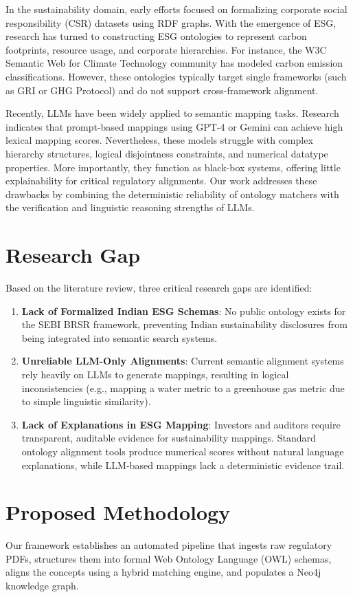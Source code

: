 \documentclass[journal,compsoc]{IEEEtran}
\begin{document}
\begin{itemize}
\begin{table}[t]
\begin{itemize}
In the sustainability domain, early efforts focused on formalizing corporate social responsibility (CSR) datasets using RDF graphs. With the emergence of ESG, research has turned to constructing ESG ontologies to represent carbon footprints, resource usage, and corporate hierarchies. For instance, the W3C Semantic Web for Climate Technology community has modeled carbon emission classifications. However, these ontologies typically target single frameworks (such as GRI or GHG Protocol) and do not support cross-framework alignment.

Recently, LLMs have been widely applied to semantic mapping tasks. Research indicates that prompt-based mappings using GPT-4 or Gemini can achieve high lexical mapping scores. Nevertheless, these models struggle with complex hierarchy structures, logical disjointness constraints, and numerical datatype properties. More importantly, they function as black-box systems, offering little explainability for critical regulatory alignments. Our work addresses these drawbacks by combining the deterministic reliability of ontology matchers with the verification and linguistic reasoning strengths of LLMs.

\section{Research Gap}
Based on the literature review, three critical research gaps are identified:
\begin{enumerate}
    \item \textbf{Lack of Formalized Indian ESG Schemas}: No public ontology exists for the SEBI BRSR framework, preventing Indian sustainability disclosures from being integrated into semantic search systems.
    \item \textbf{Unreliable LLM-Only Alignments}: Current semantic alignment systems rely heavily on LLMs to generate mappings, resulting in logical inconsistencies (e.g., mapping a water metric to a greenhouse gas metric due to simple linguistic similarity).
    \item \textbf{Lack of Explanations in ESG Mapping}: Investors and auditors require transparent, auditable evidence for sustainability mappings. Standard ontology alignment tools produce numerical scores without natural language explanations, while LLM-based mappings lack a deterministic evidence trail.
\end{enumerate}

\section{Proposed Methodology}
Our framework establishes an automated pipeline that ingests raw regulatory PDFs, structures them into formal Web Ontology Language (OWL) schemas, aligns the concepts using a hybrid matching engine, and populates a Neo4j knowledge graph.


\end{itemize}
\end{table}
\end{itemize}
\end{document}
